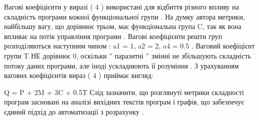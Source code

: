 \begin{description}
Вагові коефіцієнти у виразі ( 4 ) використані для відбиття різного впливу на складність програми кожної функціональної групи . На думку автора метрики, найбільшу вагу, що дорівнює трьом, має функціональна група C, так як вона впливає на потік управління програми . Вагові коефіцієнти решти груп розподіляються наступним чином : a1 = 1, a2 = 2, a4 = 0.5 . Ваговий коефіцієнт групи T НЕ дорівнює 0, оскільки '' паразитні '' змінні не збільшують складність потоку даних програми, але іноді ускладнюють її розуміння . З урахуванням вагових коефіцієнтів вираз ( 4 ) приймає вигляд:

Q = P + 2M + 3C + 0.5T
Слід зазначити, що розглянуті метрики складності програм засновані на аналізі вихідних текстів програм і графів, що забезпечує єдиний підхід до автоматизації з розрахунку .

\end{description}

